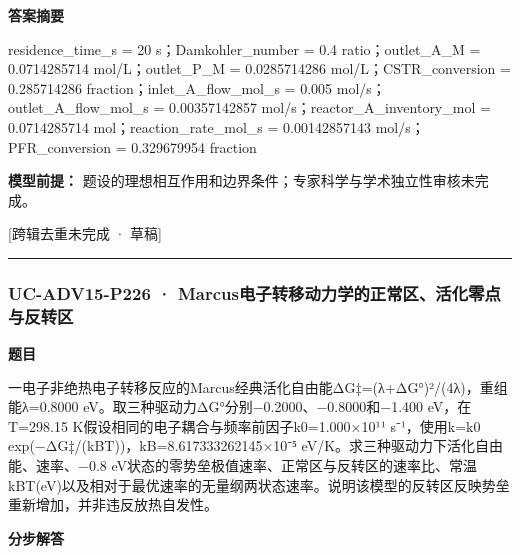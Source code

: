 \documentclass[UTF8,11pt,a4paper]{ctexart}
\begin{document}
\noindent\textbf{答案摘要}\par
residence\_time\_s = 20 s；Damkohler\_number = 0.4 ratio；outlet\_A\_M = 0.0714285714 mol/L；outlet\_P\_M = 0.0285714286 mol/L；CSTR\_conversion = 0.285714286 fraction；inlet\_A\_flow\_mol\_s = 0.005 mol/s；outlet\_A\_flow\_mol\_s = 0.00357142857 mol/s；reactor\_A\_inventory\_mol = 0.0714285714 mol；reaction\_rate\_mol\_s = 0.00142857143 mol/s；PFR\_conversion = 0.329679954 fraction\par
\noindent\textbf{模型前提：}
题设的理想相互作用和边界条件；专家科学与学术独立性审核未完成。\par
\noindent\textcolor{red!65!black}{[跨辑去重未完成 · 草稿]} \par
\medskip\hrule\medskip
{}
\subsubsection*{UC-ADV15-P226 · Marcus电子转移动力学的正常区、活化零点与反转区}
\noindent\textbf{题目}\par
一电子非绝热电子转移反应的Marcus经典活化自由能ΔG‡=(λ+ΔG°)²/(4λ)，重组能λ=0.8000 eV。取三种驱动力ΔG°分别−0.2000、−0.8000和−1.400 eV，在T=298.15 K假设相同的电子耦合与频率前因子k0=1.000×10¹¹ s⁻¹，使用k=k0 exp(−ΔG‡/(kBT))，kB=8.617333262145×10⁻⁵ eV/K。求三种驱动力下活化自由能、速率、−0.8 eV状态的零势垒极值速率、正常区与反转区的速率比、常温kBT(eV)以及相对于最优速率的无量纲两状态速率。说明该模型的反转区反映势垒重新增加，并非违反放热自发性。\par
\medskip\noindent\textbf{分步解答}
\end{document}
